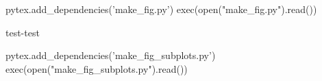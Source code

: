 \documentclass{article}
\begin{document}
    



\begin{pycode}
pytex.add_dependencies('make_fig.py')
exec(open("make_fig.py").read())
\end{pycode}
test-test
\begin{pycode}
pytex.add_dependencies('make_fig_subplots.py')
exec(open("make_fig_subplots.py").read())
\end{pycode}
\end{document}
